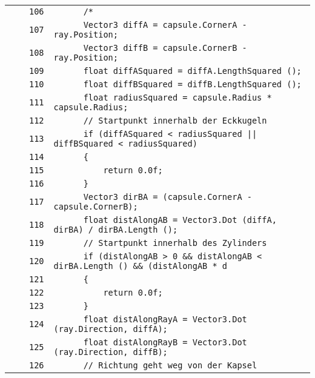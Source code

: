 \documentclass[a4paper,10pt]{article}
\begin{document}
\begin{longtable}[l]{lrrl}
\cellcolor{gray} &  & \verb~106~ & \verb~      /*~\\
\cellcolor{gray} &  & \verb~107~ & \verb~      Vector3 diffA = capsule.CornerA - ray.Position;~\\
\cellcolor{gray} &  & \verb~108~ & \verb~      Vector3 diffB = capsule.CornerB - ray.Position;~\\
\cellcolor{gray} &  & \verb~109~ & \verb~      float diffASquared = diffA.LengthSquared ();~\\
\cellcolor{gray} &  & \verb~110~ & \verb~      float diffBSquared = diffB.LengthSquared ();~\\
\cellcolor{gray} &  & \verb~111~ & \verb~      float radiusSquared = capsule.Radius * capsule.Radius;~\\
\cellcolor{gray} &  & \verb~112~ & \verb~      // Startpunkt innerhalb der Eckkugeln~\\
\cellcolor{gray} &  & \verb~113~ & \verb~      if (diffASquared < radiusSquared || diffBSquared < radiusSquared)~\\
\cellcolor{gray} &  & \verb~114~ & \verb~      {~\\
\cellcolor{gray} &  & \verb~115~ & \verb~          return 0.0f;~\\
\cellcolor{gray} &  & \verb~116~ & \verb~      }~\\
\cellcolor{gray} &  & \verb~117~ & \verb~      Vector3 dirBA = (capsule.CornerA - capsule.CornerB);~\\
\cellcolor{gray} &  & \verb~118~ & \verb~      float distAlongAB = Vector3.Dot (diffA, dirBA) / dirBA.Length ();~\\
\cellcolor{gray} &  & \verb~119~ & \verb~      // Startpunkt innerhalb des Zylinders~\\
\cellcolor{gray} &  & \verb~120~ & \verb~      if (distAlongAB > 0 && distAlongAB < dirBA.Length () && (distAlongAB * d~\\
\cellcolor{gray} &  & \verb~121~ & \verb~      {~\\
\cellcolor{gray} &  & \verb~122~ & \verb~          return 0.0f;~\\
\cellcolor{gray} &  & \verb~123~ & \verb~      }~\\
\cellcolor{gray} &  & \verb~124~ & \verb~      float distAlongRayA = Vector3.Dot (ray.Direction, diffA);~\\
\cellcolor{gray} &  & \verb~125~ & \verb~      float distAlongRayB = Vector3.Dot (ray.Direction, diffB);~\\
\cellcolor{gray} &  & \verb~126~ & \verb~      // Richtung geht weg von der Kapsel~\\

\end{longtable}
\end{document}
